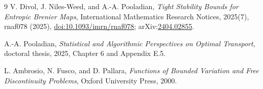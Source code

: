 \documentclass[11pt]{article}
\begin{document}
\begin{thebibliography}{9}
V. Divol, J. Niles-Weed, and A.-A. Pooladian,
\emph{Tight Stability Bounds for Entropic Brenier Maps},
International Mathematics Research Notices, 2025(7), rnaf078 (2025),
\href{https://doi.org/10.1093/imrn/rnaf078}{doi:10.1093/imrn/rnaf078};
arXiv:\href{https://arxiv.org/abs/2404.02855}{2404.02855}.

A.-A. Pooladian,
\emph{Statistical and Algorithmic Perspectives on Optimal Transport},
doctoral thesis, 2025, Chapter 6 and Appendix E.5.

L. Ambrosio, N. Fusco, and D. Pallara,
\emph{Functions of Bounded Variation and Free Discontinuity Problems},
Oxford University Press, 2000.
\end{thebibliography}
\end{document}
